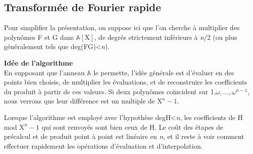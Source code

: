 \documentclass[a4paper]{article}
\begin{document}
\bigskip
\subsection{Transformée de Fourier rapide}
Pour simplifier la présentation, on suppose ici que l'on cherche à multiplier des polynômes F et G dans $\mathbb{A}[\mathrm{X}]$,
de degrés strictement inférieurs à \textit{n}/2 (ou plus généralement tels que deg(FG)<\textit{n}).


\bigskip
\textbf{Idée de l'algorithme}\\
En supposant que l'anneau $\mathbb{A}$ le permette, l'idée générale est d'évaluer en des points bien choisis, de multiplier les évaluations, et de reconstruire les coefficients du produit à partir de ces valeurs.
Si deux polynômes coïncident sur 1,$\omega,...,\omega^{n-1}$, nous verrons que leur différence est un multiple de $\mathrm{X}^n-1$.

Lorsque l'algorithme est employé avec l'hypothèse degH<\textit{n}, les coefficients de H mod $\mathrm{X}^n-1$ qui sont renvoyés sont bien ceux de H.
Le coût des étapes de précalcul et de produit point à point est linéaire en \textit{n}, et il reste à voir comment effectuer rapidement les opérations d'évaluation et d'interpolation.
\end{document}
